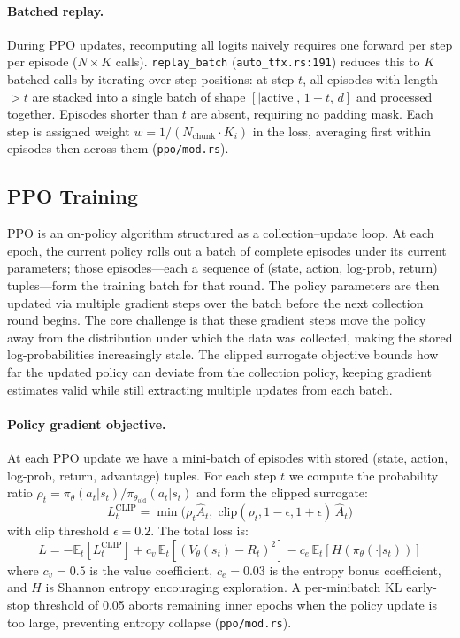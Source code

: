 \documentclass[conference]{IEEEtran}
\begin{document}
\paragraph{Batched replay.}
During PPO updates, recomputing all logits naively requires one forward per
step per episode ($N \times K$ calls).
\texttt{replay\_batch} (\texttt{auto\_tfx.rs:191}) reduces this to $K$
batched calls by iterating over step positions: at step $t$, all episodes
with length $> t$ are stacked into a single batch of shape
$[|\text{active}|,\,1{+}t,\,d]$ and processed together.
Episodes shorter than $t$ are absent, requiring no padding mask.
Each step is assigned weight $w = 1/(N_{\text{chunk}} \cdot K_i)$ in the
loss, averaging first within episodes then across them
(\texttt{ppo/mod.rs}).

\subsection{PPO Training}
\label{sec:ppo}

PPO is an on-policy algorithm structured as a collection--update loop.
At each epoch, the current policy rolls out a batch of complete episodes
under its current parameters; those episodes---each a sequence of
(state, action, log-prob, return) tuples---form the training batch for
that round.
The policy parameters are then updated via multiple gradient steps over
the batch before the next collection round begins.
The core challenge is that these gradient steps move the policy away from
the distribution under which the data was collected, making the stored
log-probabilities increasingly stale.
The clipped surrogate objective bounds how far the updated policy can
deviate from the collection policy, keeping gradient estimates valid while
still extracting multiple updates from each batch.

\paragraph{Policy gradient objective.}
At each PPO update we have a mini-batch of episodes with stored
(state, action, log-prob, return, advantage) tuples.
For each step $t$ we compute the probability ratio
$\rho_t = \pi_\theta(a_t | s_t) / \pi_{\theta_{\text{old}}}(a_t | s_t)$
and form the clipped surrogate:
%
\begin{equation}
L^{\text{CLIP}}_t = \min\!\bigl(
  \rho_t \hat{A}_t,\;
  \text{clip}(\rho_t, 1{-}\epsilon, 1{+}\epsilon)\,\hat{A}_t
\bigr)
\label{eq:ppo}
\end{equation}
%
with clip threshold $\epsilon = 0.2$.
The total loss is:
%
\begin{equation}
L = -\mathbb{E}_t\!\left[L^{\text{CLIP}}_t\right]
    + c_v\,\mathbb{E}_t\!\left[(V_\theta(s_t) - R_t)^2\right]
    - c_e\,\mathbb{E}_t\!\left[H(\pi_\theta(\cdot|s_t))\right]
\label{eq:ppofull}
\end{equation}
%
where $c_v = 0.5$ is the value coefficient, $c_e = 0.03$ is the entropy
bonus coefficient, and $H$ is Shannon entropy encouraging exploration.
A per-minibatch KL early-stop threshold of 0.05 aborts remaining inner
epochs when the policy update is too large, preventing entropy collapse
(\texttt{ppo/mod.rs}).
\end{document}
